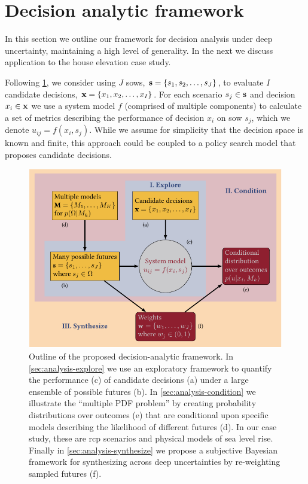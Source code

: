 \documentclass{agujournal2019}
\begin{document}
\section{Decision analytic framework}\label{sec:analysis}

In this section we outline our framework for decision analysis under deep uncertainty, maintaining a high level of generality.
In the next we discuss application to the house elevation case study.

Following \cref{fig:flowchart}, we consider using $J$ \glspl{sow}, $\vb{s} = \qty{s_1, s_2, \ldots, s_J}$, to evaluate $I$ candidate decisions, $\vb{x} = \qty{x_1, x_2, \ldots, x_I}$.
For each scenario $s_j \in \vb{s}$ and decision $x_i \in \vb{x}$ we use a system model $f$ (comprised of multiple components) to calculate a set of metrics describing the performance of decision $x_i$ on \gls{sow} $s_j$, which we denote $u_{ij} = f(x_i, s_j)$.
While we assume for simplicity that the decision space is known and finite, this approach could be coupled to a policy search model that proposes candidate decisions.

\begin{figure}
  \centering
  \includegraphics[width=\textwidth]{bayes-rdm.pdf}
  \caption{
    Outline of the proposed decision-analytic framework.
    In \cref{sec:analysis-explore} we use an exploratory framework to quantify the performance (c) of candidate decisions (a) under a large ensemble of possible futures (b).
    In \cref{sec:analysis-condition} we illustrate the ``multiple PDF problem'' by creating probability distributions over outcomes (e) that are conditional upon specific models describing the likelihood of different futures (d).
    In our case study, these are \gls{rcp} scenarios and physical models of sea level rise.
    Finally in \cref{sec:analysis-synthesize} we propose a subjective Bayesian framework for synthesizing across deep uncertainties by re-weighting sampled futures (f).
  }\label{fig:flowchart}
\end{figure}
\end{document}

